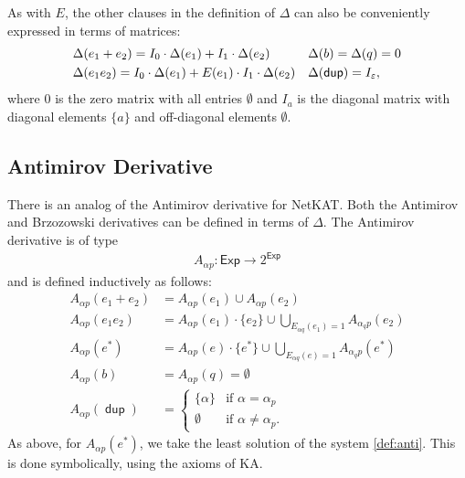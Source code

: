 \documentclass{article}
\newcommand\pdup{\mathop{\mathsf{dup}}}
\newcommand\Exp{\mathsf{Exp}}
\renewcommand\star{^{\textstyle *}}
\renewcommand\powerset[1]{2^{#1}}
\newcommand\STD{\Delta}
\newcommand\Anti{A}
\newcommand\STDM{\Delta}
\begin{document}
As with $E$, the other clauses in the definition of $\STD$ can also be conveniently expressed in terms of matrices:
\begin{align*}
& \STDM(e_1+e_2) = I_0\cdot\STDM(e_1) + I_1\cdot\STDM(e_2) && \STDM(b) = \STDM(q) = 0\\
& \STDM(e_1e_2) = I_0\cdot\STDM(e_1) + E(e_1)\cdot I_1\cdot\STDM(e_2) && \STDM(\pdup) = I_\eps,
\end{align*}
where $0$ is the zero matrix with all entries $\emptyset$ and $I_a$ is the diagonal matrix with diagonal elements $\{a\}$ and off-diagonal elements $\emptyset$.

\subsection*{Antimirov Derivative}

There is an analog of the Antimirov derivative for NetKAT. Both the Antimirov and Brzozowski derivatives can be defined in terms of $\STD$. The Antimirov derivative is of type
\begin{align*}
\Anti_{\alpha p} : \Exp\to\powerset\Exp
\end{align*}
and is defined inductively as follows:
\begin{align}
\Anti_{\alpha p}(e_1+e_2) &= \Anti_{\alpha p}(e_1) \cup \Anti_{\alpha p}(e_2)\nonumber\\
\Anti_{\alpha p}(e_1e_2) &= \Anti_{\alpha p}(e_1)\cdot\{e_2\} \cup \bigcup_{E_{\alpha q}(e_1)=1}\Anti_{\alpha_q p}(e_2)\nonumber\\
\Anti_{\alpha p}(e\star) &= \Anti_{\alpha p}(e)\cdot\{e\star\} \cup \bigcup_{E_{\alpha q}(e)=1}\Anti_{\alpha_q p}(e\star)\label{def:anti}\\
\Anti_{\alpha p}(b) &= \Anti_{\alpha p}(q) = \emptyset\nonumber\\
\Anti_{\alpha p}(\pdup) &= \begin{cases}
\{\alpha\} & \text{if $\alpha=\alpha_p$}\\
\emptyset & \text{if $\alpha\neq\alpha_p$.}\end{cases}\nonumber
\end{align}
As above, for $\Anti_{\alpha p}(e\star)$, we take the least solution of the system \eqref{def:anti}.
This is done symbolically, using the axioms of KA.
\end{document}
